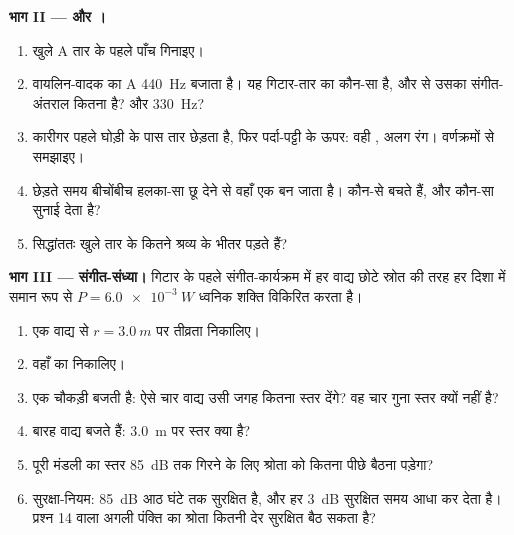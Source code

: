 \begin{problem}
\medskip
\noindent\textbf{भाग II ---  और ।}
\begin{enumerate}[resume]
  \item खुले A तार के पहले पाँच  गिनाइए।
  \item वायलिन-वादक का A \qty{440}{Hz} बजाता है। यह गिटार-तार का कौन-सा
         है, और  से उसका संगीत-अंतराल कितना
        है? और \qty{330}{Hz}?
  \item कारीगर पहले घोड़ी के पास तार छेड़ता है, फिर पर्दा-पट्टी के ऊपर: वही
        , अलग रंग। वर्णक्रमों से समझाइए।
  \item छेड़ते समय बीचोंबीच हलका-सा छू देने से वहाँ एक 
        बन जाता है। कौन-से  बचते हैं, और कौन-सा
         सुनाई देता है?
  \item सिद्धांततः खुले तार के कितने  श्रव्य  के
        भीतर पड़ते हैं?
\end{enumerate}

\medskip
\noindent\textbf{भाग III --- संगीत-संध्या।}
गिटार के पहले संगीत-कार्यक्रम में हर वाद्य छोटे स्रोत की तरह हर दिशा में
समान रूप से $P = \qty{6.0e-3}{W}$ ध्वनिक शक्ति विकिरित करता है।
\begin{enumerate}[resume]
  \item एक वाद्य से $r = \qty{3.0}{m}$ पर तीव्रता निकालिए।
  \item वहाँ का  निकालिए।
  \item एक चौकड़ी बजती है: ऐसे चार वाद्य उसी जगह कितना स्तर देंगे? वह चार
        गुना स्तर क्यों नहीं है?
  \item बारह वाद्य बजते हैं: \qty{3.0}{m} पर स्तर क्या है?
  \item पूरी मंडली का स्तर \qty{85}{dB} तक गिरने के लिए श्रोता को कितना पीछे
        बैठना पड़ेगा?
  \item सुरक्षा-नियम: \qty{85}{dB} आठ घंटे तक सुरक्षित है, और हर \qty{+3}{dB} सुरक्षित
        समय आधा कर देता है। प्रश्न 14 वाला अगली पंक्ति का श्रोता कितनी देर
        सुरक्षित बैठ सकता है?
\end{enumerate}


\end{problem}
